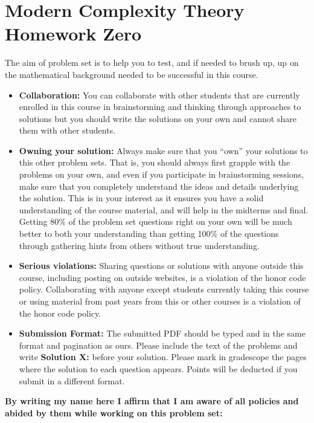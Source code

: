 \documentclass[11pt]{article}
\begin{document}
\section*{Modern Complexity Theory Homework Zero}\label{homework-zero}

The aim of problem set is to help you to test, and if needed to brush up, up on the mathematical
background needed to be successful in this course. 

\begin{itemize}
\item
  {\bf Collaboration:} You can collaborate with other students that are currently enrolled in
  this course  in brainstorming and thinking through approaches to
  solutions but you should write the solutions on your own and cannot
  share them with other students. 
\item
  {\bf Owning your solution:} Always make sure that you ``own'' your solutions to this other problem
  sets. That is, you should always first grapple with the problems on
  your own, and even if you participate in brainstorming sessions, make
  sure that you completely understand the ideas and details underlying
  the solution. This is in your interest as it ensures you have a solid
  understanding of the course material, and will help in the midterms
  and final. Getting 80\% of the problem
  set questions right on your own will be much better to both your
  understanding than getting 100\% of the questions through
  gathering hints from others without true understanding.
\item
  {\bf Serious violations:} Sharing questions or solutions with anyone outside this course,
  including posting on outside websites, is a violation of the honor
  code policy. Collaborating with anyone except students currently
  taking this course or using material from past years from this or
  other courses is a violation of the honor code policy.
\item
  {\bf Submission Format:} The submitted PDF should be typed and in the same format and
  pagination as ours. Please include the text of the problems and write
  \textbf{Solution X:} before your solution. Please mark in gradescope 
  the pages where
  the solution to each question appears. Points will be deducted if you
  submit in a different format.
\end{itemize}

\textbf{By writing my name here I affirm that I am aware of all policies
and abided by them while working on this problem set:}
\end{document}
